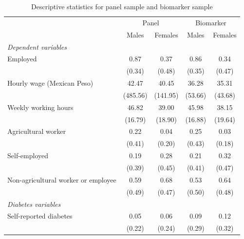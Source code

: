 \documentclass[12pt,english]{article}
\begin{document}
\begin{table}
\caption{\label{tab:Pooled-sample-characteristics}Descriptive statistics for panel sample and biomarker sample}
\begin{adjustbox}{max width=0.9\textwidth, center}
{
\def\sym#1{\ifmmode^{#1}\else\(^{#1}\)\fi}
\begin{tabular}{l*{4}{c}}
\toprule
                    &\multicolumn{2}{c}{Panel}&\multicolumn{2}{c}{Biomarker}\\\cmidrule(lr){2-3}\cmidrule(lr){4-5}
                    &\multicolumn{1}{c}{Males}&\multicolumn{1}{c}{Females}&\multicolumn{1}{c}{Males}&\multicolumn{1}{c}{Females}\\
                    \midrule
\hspace*{10mm}\emph{Dependent variables} \\
Employed            &        0.87&        0.37&        0.86&        0.34\\
                    &      (0.34)&      (0.48)&      (0.35)&      (0.47)\\
Hourly wage (Mexican Peso)        &       42.47&       40.45&       36.28&       35.31\\
                    &    (485.56)&    (141.95)&     (53.66)&     (43.68)\\
Weekly working hours&       46.82&       39.00&       45.98&       38.15\\
                    &     (16.79)&     (18.90)&     (16.88)&     (19.64)\\
Agricultural worker &        0.22&        0.04&        0.25&        0.03\\
                    &      (0.41)&      (0.20)&      (0.43)&      (0.18)\\
Self-employed       &        0.19&        0.28&        0.21&        0.32\\
                    &      (0.39)&      (0.45)&      (0.41)&      (0.47)\\
Non-agricultural worker or employee&        0.59&        0.68&        0.53&        0.64\\
					&      (0.49)&      (0.47)&      (0.50)&      (0.48)\\
\hspace*{10mm}\emph{Diabetes variables} \\
Self-reported diabetes  &        0.05&        0.06&        0.09&        0.12\\
                    &      (0.22)&      (0.24)&      (0.29)&      (0.32)\\

\end{tabular}}
\end{adjustbox}
\end{table}
\end{document}
